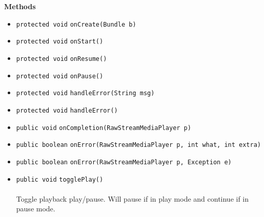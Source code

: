 \textbf{\sffamily Methods}
\begin{itemize}
\item \lstinline|protected void| \lstinline|onCreate|\lstinline|(Bundle b)| \\[-0.6em]




\item \lstinline|protected void| \lstinline|onStart|\lstinline|()| \\[-0.6em]




\item \lstinline|protected void| \lstinline|onResume|\lstinline|()| \\[-0.6em]




\item \lstinline|protected void| \lstinline|onPause|\lstinline|()| \\[-0.6em]




\item \lstinline|protected void| \lstinline|handleError|\lstinline|(String msg)| \\[-0.6em]




\item \lstinline|protected void| \lstinline|handleError|\lstinline|()| \\[-0.6em]




\item \lstinline|public void| \lstinline|onCompletion|\lstinline|(RawStreamMediaPlayer p)| \\[-0.6em]




\item \lstinline|public boolean| \lstinline|onError|\lstinline|(RawStreamMediaPlayer p, int what, int extra)| \\[-0.6em]




\item \lstinline|public boolean| \lstinline|onError|\lstinline|(RawStreamMediaPlayer p, Exception e)| \\[-0.6em]




\item \lstinline|public void| \lstinline|togglePlay|\lstinline|()|\\ \\[-0.6em]
Toggle playback play/pause. Will pause if in play mode and continue if
 in pause mode.




\end{itemize}
